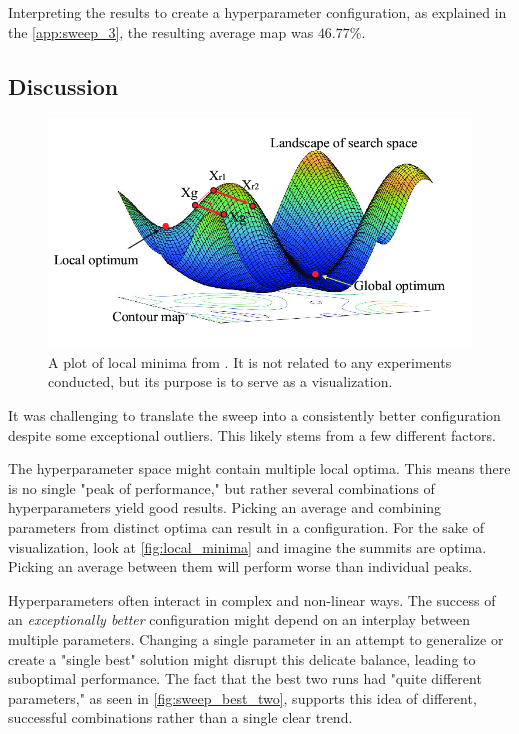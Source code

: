 Interpreting the results to create a hyperparameter configuration, as explained in the \autoref{app:sweep_3}, the resulting average \acrshort{map} was \(46.77\%\). 

\subsection{Discussion}
\label{ssec:ex4_discussion}

\begin{figure}
    \centering
    \includegraphics[width=0.75\linewidth]{figures/local_minima.png}
    \caption{A plot of local minima from \cite{fig:multiple_local_minima}. It is not related to any experiments conducted, but its purpose is to serve as a visualization.}
    \label{fig:local_minima}
\end{figure}

It was challenging to translate the sweep into a consistently better configuration despite some exceptional outliers. This likely stems from a few different factors. 

The hyperparameter space might contain multiple local optima. This means there is no single "peak of performance," but rather several combinations of hyperparameters yield good results. Picking an average and combining parameters from distinct optima can result in a configuration. For the sake of visualization, look at \autoref{fig:local_minima} and imagine the summits are optima. Picking an average between them will perform worse than individual peaks. 

Hyperparameters often interact in complex and non-linear ways. The success of an \emph{exceptionally better} configuration might depend on an interplay between multiple parameters. Changing a single parameter in an attempt to generalize or create a "single best" solution might disrupt this delicate balance, leading to suboptimal performance. The fact that the best two runs had "quite different parameters," as seen in \autoref{fig:sweep_best_two}, supports this idea of different, successful combinations rather than a single clear trend.

